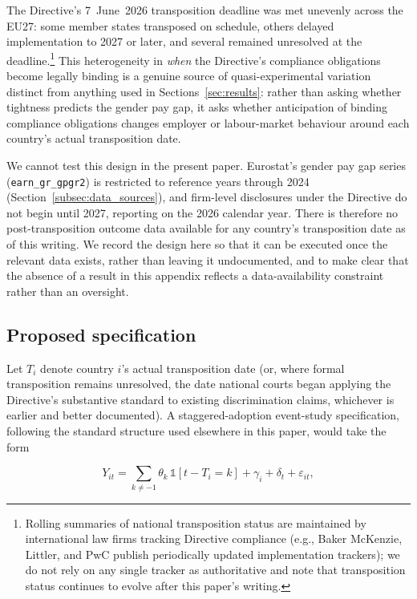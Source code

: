 \documentclass[12pt,a4paper]{article}
\begin{document}
The Directive's 7~June~2026 transposition deadline was met unevenly across
the EU27: some member states transposed on schedule, others delayed
implementation to 2027 or later, and several remained unresolved at the
deadline.\footnote{Rolling summaries of national transposition status are
maintained by international law firms tracking Directive compliance (e.g.,
Baker McKenzie, Littler, and PwC publish periodically updated implementation
trackers); we do not rely on any single tracker as authoritative and note
that transposition status continues to evolve after this paper's writing.}
This heterogeneity in \emph{when} the Directive's compliance obligations
become legally binding is a genuine source of quasi-experimental variation
distinct from anything used in Sections~\ref{sec:results}: rather than
asking whether tightness predicts the gender pay gap, it asks whether
anticipation of binding compliance obligations changes employer or
labour-market behaviour around each country's actual transposition date.

We cannot test this design in the present paper.  Eurostat's gender pay gap
series (\texttt{earn\_gr\_gpgr2}) is restricted to reference years through
2024 (Section~\ref{subsec:data_sources}), and firm-level disclosures under
the Directive do not begin until 2027, reporting on the 2026 calendar year.
There is therefore no post-transposition outcome data available for any
country's transposition date as of this writing.  We record the design here
so that it can be executed once the relevant data exists, rather than leaving
it undocumented, and to make clear that the absence of a result in this
appendix reflects a data-availability constraint rather than an oversight.

\subsection*{Proposed specification}

Let $T_i$ denote country $i$'s actual transposition date (or, where formal
transposition remains unresolved, the date national courts began applying
the Directive's substantive standard to existing discrimination claims,
whichever is earlier and better documented).  A staggered-adoption
event-study specification, following the standard structure used elsewhere
in this paper, would take the form

\begin{equation}
Y_{it} = \sum_{k \neq -1} \theta_k \,\mathbb{1}[t - T_i = k]
  + \gamma_i + \delta_t + \varepsilon_{it},
\label{eq:transposition}
\end{equation}
\end{document}
